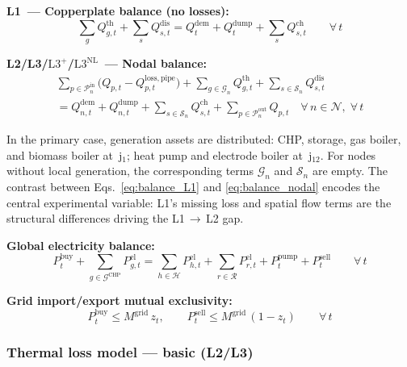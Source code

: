 \documentclass[review,3p]{elsarticle}
\newcommand{\Lplus}{\mathrm{L3}^{+}}
\newcommand{\Lnl}{\mathrm{L3}^{\mathrm{NL}}}
\begin{document}
\textbf{L1~--- Copperplate balance (no losses):}
\begin{equation}
  \sum_{g} Q_{g,t}^{\mathrm{th}}
    + \sum_{s} Q_{s,t}^{\mathrm{dis}}
  = Q_t^{\mathrm{dem}} + Q_t^{\mathrm{dump}}
    + \sum_{s} Q_{s,t}^{\mathrm{ch}}
  \qquad \forall\, t
  \label{eq:balance_L1}
\end{equation}

\textbf{L2/L3/$\Lplus$/$\Lnl$~--- Nodal balance:}
\begin{multline}
  \sum_{p \in \mathcal{P}_n^{\mathrm{in}}}
    \bigl(Q_{p,t} - Q_{p,t}^{\mathrm{loss,pipe}}\bigr)
  + \sum_{g \in \mathcal{G}_n} Q_{g,t}^{\mathrm{th}}
  + \sum_{s \in \mathcal{S}_n} Q_{s,t}^{\mathrm{dis}} \\
  = Q_{n,t}^{\mathrm{dem}} + Q_{n,t}^{\mathrm{dump}}
  + \sum_{s \in \mathcal{S}_n} Q_{s,t}^{\mathrm{ch}}
  + \sum_{p \in \mathcal{P}_n^{\mathrm{out}}} Q_{p,t}
  \quad \forall\, n \in \mathcal{N},\; \forall\, t
  \label{eq:balance_nodal}
\end{multline}

In the primary case, generation assets are distributed: CHP, storage,
gas boiler, and biomass boiler at~j$_1$; heat pump and electrode
boiler at~j$_{12}$. For nodes without local generation, the
corresponding terms $\mathcal{G}_n$ and $\mathcal{S}_n$ are empty.
The contrast between Eqs.~\eqref{eq:balance_L1} and
\eqref{eq:balance_nodal} encodes the central experimental variable:
L1's missing loss and spatial flow terms are the structural
differences driving the L1\,$\to$\,L2 gap.

\textbf{Global electricity balance:}
\begin{equation}
  P_t^{\mathrm{buy}}
    + \sum_{g \in \mathcal{G}^{\mathrm{CHP}}} P_{g,t}^{\mathrm{el}}
  = \sum_{h \in \mathcal{H}} P_{h,t}^{\mathrm{el}}
    + \sum_{r \in \mathcal{R}} P_{r,t}^{\mathrm{el}}
    + P_t^{\mathrm{pump}}
    + P_t^{\mathrm{sell}}
  \qquad \forall\, t
  \label{eq:balance_el}
\end{equation}

\textbf{Grid import/export mutual exclusivity:}
\begin{equation}
  P_t^{\mathrm{buy}} \leq M^{\mathrm{grid}}\, z_t, \qquad
  P_t^{\mathrm{sell}} \leq M^{\mathrm{grid}}\, (1 - z_t)
  \qquad \forall\, t
  \label{eq:grid_bigm}
\end{equation}

\subsubsection{Thermal loss model --- basic (L2/L3)}
\label{sec:model_losses}
\end{document}
